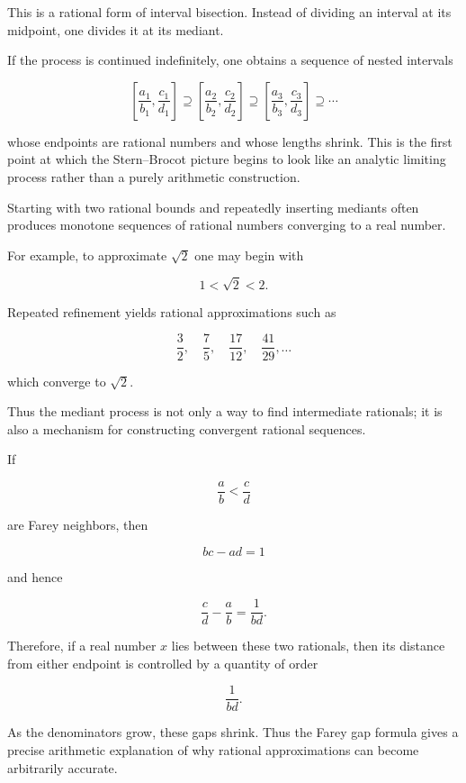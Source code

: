 \begin{remark*}
This is a rational form of interval bisection.  Instead of dividing an
interval at its midpoint, one divides it at its mediant.
\end{remark*}

\begin{remark*}
If the process is continued indefinitely, one obtains a sequence of
nested intervals

\[
\left[\frac{a_1}{b_1},\frac{c_1}{d_1}\right]
\supseteq
\left[\frac{a_2}{b_2},\frac{c_2}{d_2}\right]
\supseteq
\left[\frac{a_3}{b_3},\frac{c_3}{d_3}\right]
\supseteq \cdots
\]

whose endpoints are rational numbers and whose lengths shrink.
This is the first point at which the Stern--Brocot picture begins to
look like an analytic limiting process rather than a purely arithmetic
construction.
\end{remark*}


\begin{remark*}
Starting with two rational bounds and repeatedly inserting mediants
often produces monotone sequences of rational numbers converging to a
real number.

For example, to approximate $\sqrt{2}$ one may begin with

\[
1 < \sqrt{2} < 2.
\]

Repeated refinement yields rational approximations such as

\[
\frac{3}{2},\quad
\frac{7}{5},\quad
\frac{17}{12},\quad
\frac{41}{29},\dots
\]

which converge to $\sqrt{2}$.

Thus the mediant process is not only a way to find intermediate
rationals; it is also a mechanism for constructing convergent rational
sequences.
\end{remark*}


\begin{remark*}
If

\[
\frac{a}{b} < \frac{c}{d}
\]

are Farey neighbors, then

\[
bc-ad=1
\]

and hence

\[
\frac{c}{d}-\frac{a}{b}=\frac{1}{bd}.
\]

Therefore, if a real number $x$ lies between these two rationals, then
its distance from either endpoint is controlled by a quantity of order

\[
\frac{1}{bd}.
\]

As the denominators grow, these gaps shrink.  Thus the Farey gap formula
gives a precise arithmetic explanation of why rational approximations
can become arbitrarily accurate.
\end{remark*}

